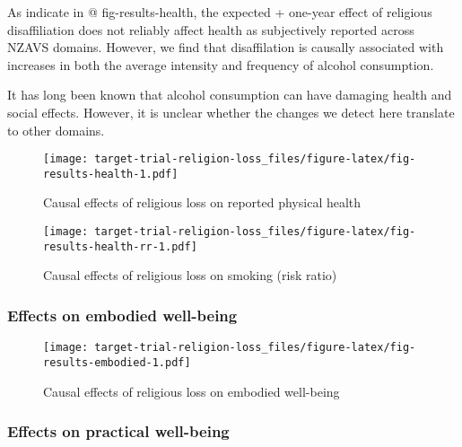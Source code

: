\documentclass[
  letterpaper,
  DIV=11,
  numbers=noendperiod]{scrartcl}
\begin{document}
As indicate in @ fig-results-health, the expected + one-year effect of
religious disaffiliation does not reliably affect health as subjectively
reported across NZAVS domains. However, we find that disaffilation is
causally associated with increases in both the average intensity and
frequency of alcohol consumption.

It has long been known that alcohol consumption can have damaging health
and social effects. However, it is unclear whether the changes we detect
here translate to other domains.

\begin{figure}

{\centering \texttt{[image: target-trial-religion-loss\_files/figure-latex/fig-results-health-1.pdf]}

}

\caption{\label{fig-results-health}Causal effects of religious loss on
reported physical health}

\end{figure}

\begin{figure}

{\centering \texttt{[image: target-trial-religion-loss\_files/figure-latex/fig-results-health-rr-1.pdf]}

}

\caption{\label{fig-results-health-rr}Causal effects of religious loss
on smoking (risk ratio)}

\end{figure}

\hypertarget{effects-on-embodied-well-being}{%
\subsubsection{Effects on embodied
well-being}\label{effects-on-embodied-well-being}}

\begin{figure}

{\centering \texttt{[image: target-trial-religion-loss\_files/figure-latex/fig-results-embodied-1.pdf]}

}

\caption{\label{fig-results-embodied}Causal effects of religious loss on
embodied well-being}

\end{figure}

\hypertarget{effects-on-practical-well-being}{%
\subsubsection{Effects on practical
well-being}\label{effects-on-practical-well-being}}
\end{document}
